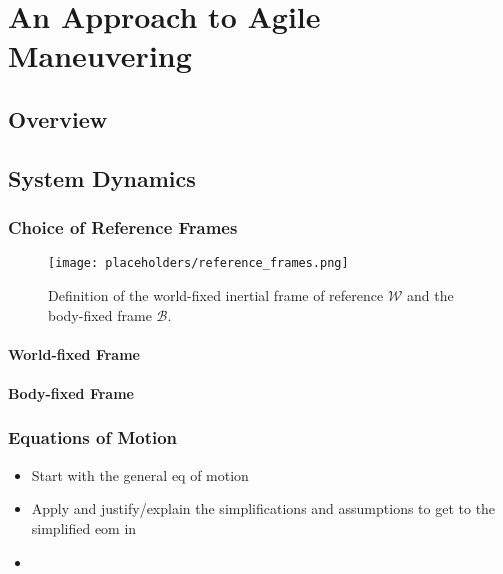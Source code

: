 
\chapter{An Approach to Agile Maneuvering}
\label{sec:approach-to-agile-maneuvering}

\section{Overview}

\section{System Dynamics}
\label{sec:system-dynamics}

\subsection{Choice of Reference Frames}
\begin{figure}[h!]
	\centering
	\texttt{[image: placeholders/reference\_frames.png]}
	\caption{Definition of the world-fixed inertial frame of reference $\mathcal{W}$ and the body-fixed frame $\mathcal{B}$.}
\end{figure}
\subsubsection{World-fixed Frame}
\subsubsection{Body-fixed Frame}

\subsection{Equations of Motion}

\begin{itemize}
	\color{red}
	\item Start with the general eq of motion
	\item Apply and justify/explain the simplifications and assumptions to get to the simplified eom in  
	\item 
\end{itemize}


